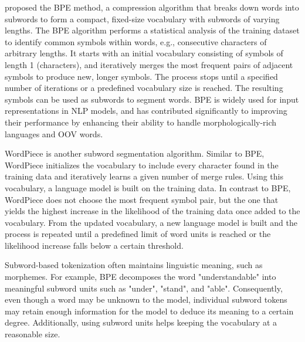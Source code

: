 \citet{gage1994new} proposed the \ac{BPE} method, a compression algorithm that breaks down words into subwords to form a compact, fixed-size vocabulary with subwords of varying lengths. The \ac{BPE} algorithm performs a statistical analysis of the training dataset to identify common symbols within words, e.g., consecutive characters of arbitrary lengths. It starts with an initial vocabulary consisting of symbols of length 1 (characters), and iteratively merges the most frequent pairs of adjacent symbols to produce new, longer symbols. The process stops until a specified number of iterations or a predefined vocabulary size is reached. The resulting symbols can be used as subwords to segment words. \ac{BPE} is widely used for input representations in \ac{NLP} models, and has contributed significantly to improving their performance by enhancing their ability to handle morphologically-rich languages and \ac{OOV} words.

WordPiece \citep{wu2016google} is another subword segmentation algorithm. Similar to \ac{BPE}, WordPiece initializes the vocabulary to include every character found in the training data and iteratively learns a given number of merge rules. Using this vocabulary, a language model is built on the training data. In contrast to \ac{BPE}, WordPiece does not choose the most frequent symbol pair, but the one that yields the highest increase in the likelihood of the training data once added to the vocabulary. From the updated vocabulary, a new language model is built and the process is repeated until a predefined limit of word units is reached or the likelihood increase falls below a certain threshold. 


Subword-based tokenization often maintains linguistic meaning, such as morphemes. For example, \ac{BPE} decomposes the word "understandable" into meaningful subword units such as "under", "stand", and "able". Consequently, even though a word may be unknown to the model, individual subword tokens may retain enough information for the model to deduce its meaning to a certain degree. Additionally, using subword units helps keeping the vocabulary at a reasonable size.


